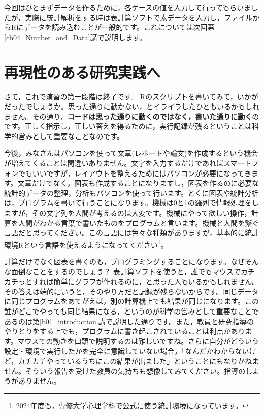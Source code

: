 \documentclass{ltjsbook}
\begin{document}
今回はひとまずデータを作るために，各ケースの値を入力して行ってもらいましたが，実際に統計解析をする時は表計算ソフトで素データを入力し，ファイルからRにデータを読み込むことが一般的です。これについては次回第\ref{cb04_Number_and_Data}講で説明します。


\section{再現性のある研究実践へ}
\label{reproducibility}

さて，これで演習の第一段階は終了です。
Rのスクリプトを書いてみて，いかがだったでしょうか。思った通りに動かない，とイライラしたひともいるかもしれません。その通り，\textbf{コードは思った通りに動くのではなく，書いた通りに動く}のです。正しく指示し，正しい答えを得るために，実行記録が残るということは科学的営みとして重要なことなのです。

今後，みなさんはパソコンを使って文章(レポートや論文)を作成するという機会が増えてくることは間違いありません。文字を入力するだけであればスマートフォンでもいいですが，レイアウトを整えるためにはパソコンが必要になってきます。文章だけでなく，図表も作成することになりますし，図表を作るのに必要な統計的データの整理，分析もパソコンを使って行います。とくに図表や統計分析は，プログラムを書いて行うことになります。機械は0と1の羅列で情報処理をしますが，その文字列を人間が考えるのは大変です。機械にやって欲しい操作，計算を人間がわかる言葉で書いたものをプログラムと言います。機械と人間を繋ぐ言語だと思ってください。この言語には色々な種類がありますが，基本的に統計環境Rという言語を使えるようになってください\footnote{2024年度も，専修大学心理学科で公式に使う統計環境になっています。}。

計算だけでなく図表を書くのも，プログラミングすることになります。なぜそんな面倒なことをするのでしょう？ 表計算ソフトを使うと，誰でもマウスでカチカチっとすれば簡単にグラフが作れるのに，と思った人もいるかもしれません。その答えは端的にいうと，そのやり方だと記録が残らないからです。同じデータに同じプログラムをあてがえば，別の計算機上でも結果が同じになります。この誰がどこでやっても同じ結果になる，というのが科学の営みとして重要なことであるのは第\ref{b01_introduction}講で説明した通りです。また，教員と研究指導のやりとりをする上でも，プログラムに書き起こされていることは利点があります。マウスでの動きを口頭で説明するのは難しいですね。さらに自分がどういう設定・環境で実行したかを完全に意識していない場合，「なんだかわからないけど，カチカチやっているうちにこの結果が出ました」ということにもなりかねません。そういう報告を受けた教員の気持ちも想像してみてください。指導のしようがありません。
\end{document}
